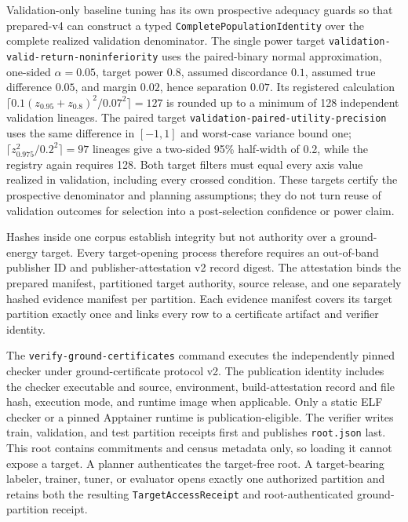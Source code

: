 \documentclass[11pt,a4paper]{article}
\newcommand{\code}[1]{\texttt{\small #1}}
\theoremstyle{definition}\newtheorem{definition}[proposition]{Definition}
\begin{document}
Validation-only baseline tuning has its own prospective adequacy guards so that prepared-v4 can construct a typed \texttt{CompletePopulationIdentity} over the complete realized validation denominator. The single power target \texttt{validation-valid-return-noninferiority} uses the paired-binary normal approximation, one-sided $\alpha=0.05$, target power $0.8$, assumed discordance $0.1$, assumed true difference $0.05$, and margin $0.02$, hence separation $0.07$. Its registered calculation $\lceil0.1(z_{0.95}+z_{0.8})^2/0.07^2\rceil=127$ is rounded up to a minimum of 128 independent validation lineages. The paired target \texttt{validation-paired-utility-precision} uses the same difference in $[-1,1]$ and worst-case variance bound one; $\lceil z_{0.975}^2/0.2^2\rceil=97$ lineages give a two-sided 95\% half-width of 0.2, while the registry again requires 128. Both target filters must equal every axis value realized in validation, including every crossed condition. These targets certify the prospective denominator and planning assumptions; they do not turn reuse of validation outcomes for selection into a post-selection confidence or power claim.

Hashes inside one corpus establish integrity but not authority over a ground-energy target. Every target-opening process therefore requires an out-of-band publisher ID and publisher-attestation v2 record digest. The attestation binds the prepared manifest, partitioned target authority, source release, and one separately hashed evidence manifest per partition. Each evidence manifest covers its target partition exactly once and links every row to a certificate artifact and verifier identity.

The \texttt{verify-ground-certificates} command executes the independently pinned checker under ground-certificate protocol v2. The publication identity includes the checker executable and source, environment, build-attestation record and file hash, execution mode, and runtime image when applicable. Only a static ELF checker or a pinned Apptainer runtime is publication-eligible. The verifier writes train, validation, and test partition receipts first and publishes \code{root.json} last. This root contains commitments and census metadata only, so loading it cannot expose a target. A planner authenticates the target-free root. A target-bearing labeler, trainer, tuner, or evaluator opens exactly one authorized partition and retains both the resulting \texttt{TargetAccessReceipt} and root-authenticated ground-partition receipt.
\end{document}
